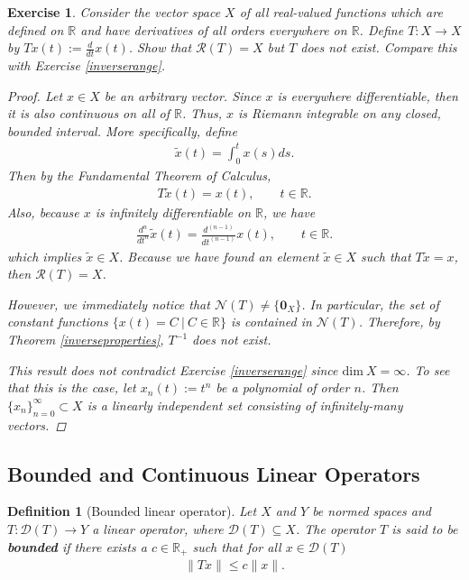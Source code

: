 \documentclass[11pt]{article}
\theoremstyle{mystyle}
\newtheorem{defn}{Definition}[section]
\newtheorem{protoexer}{Exercise}[section]
\newenvironment{exer}
{\colorlet{shadecolor}{blue!15}\begin{shaded}\begin{protoexer}}
{\end{protoexer}\end{shaded}}
\newcommand{\0}{\mathbf{0}}
\begin{document}
\begin{exer}
    Consider the vector space $X$ of all real-valued functions which are defined on $\mathbb{R}$ and have derivatives of all orders everywhere on $\mathbb{R}$. Define $T: X \longrightarrow X$ by $Tx(t) := \frac{d}{dt}x(t)$. Show that $\mathscr{R}(T) = X$ but $T$ does not exist. Compare this with Exercise \ref{inverserange}.
    
    \begin{proof}
    Let $x \in X$ be an arbitrary vector. Since $x$ is everywhere differentiable, then it is also continuous on all of $\mathbb{R}$. Thus, $x$ is Riemann integrable on any closed, bounded interval. More specifically, define 
    \begin{align*}
        \tilde{x}(t) = \int_0^t  x(s) ds.
    \end{align*}
    Then by the Fundamental Theorem of Calculus, 
    \begin{align*}
        T\tilde{x}(t) = x(t), \qquad t \in \mathbb{R}.
    \end{align*}
    Also, because $x$ is infinitely differentiable on $\mathbb{R}$, we have
    \begin{align*}
        \frac{d^{n}}{dt^{n}}\tilde{x}(t) = \frac{d^{(n-1)}}{dt^{(n-1)}}x(t), \qquad  t \in \mathbb{R}.
    \end{align*}
    which implies $\tilde{x} \in X$. Because we have found an element $\tilde{x} \in X$ such that $T\tilde{x} = x$, then $\mathscr{R}(T) = X$.
    
    However, we immediately notice that $\mathscr{N}(T) \neq \{\0_X\}$. In particular, the set of constant functions $\{ x(t) = C  \ | \ C \in \mathbb{R} \}$ is contained in $\mathscr{N}(T)$. Therefore, by Theorem \ref{inverseproperties}, $T^{-1}$ does not exist.
    
    This result does not contradict Exercise \ref{inverserange} since $\text{dim} \ X = \infty$. To see that this is the case, let $x_n(t) := t^n$ be a polynomial of order $n$. Then $\{x_n\}_{n=0}^{\infty} \subset X$ is a linearly independent set consisting of infinitely-many vectors.
    \end{proof}
\end{exer}

\subsection{Bounded and Continuous Linear Operators}

\begin{defn}[Bounded linear operator]\label{boundedlinearoperator}
Let $X$ and $Y$ be normed spaces and $T: \mathscr{D}(T) \longrightarrow Y$ a linear operator, where $\mathscr{D}(T) \subseteq X$. The operator $T$ is said to be \textbf{bounded} if there exists a $c \in \mathbb{R}_+$ such that for all $x \in \mathscr{D}(T)$
\begin{align*}
    \|Tx\| \leq c \|x\|.
\end{align*}
\end{defn}
\end{document}
